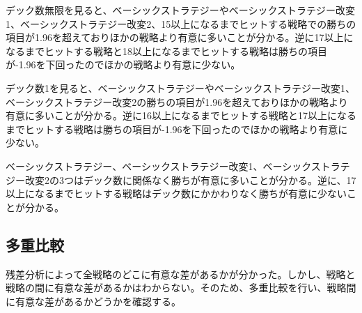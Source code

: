 デック数無限を見ると、ベーシックストラテジーやベーシックストラテジー改変1、ベーシックストラテジー改変2、15以上になるまでヒットする戦略での勝ちの項目が1.96を超えておりほかの戦略より有意に多いことが分かる。逆に17以上になるまでヒットする戦略と18以上になるまでヒットする戦略は勝ちの項目が-1.96を下回ったのでほかの戦略より有意に少ない。

デック数1を見ると、ベーシックストラテジーやベーシックストラテジー改変1、ベーシックストラテジー改変2の勝ちの項目が1.96を超えておりほかの戦略より有意に多いことが分かる。逆に16以上になるまでヒットする戦略と17以上になるまでヒットする戦略は勝ちの項目が-1.96を下回ったのでほかの戦略より有意に少ない。

ベーシックストラテジー、ベーシックストラテジー改変1、ベーシックストラテジー改変2の3つはデック数に関係なく勝ちが有意に多いことが分かる。逆に、17以上になるまでヒットする戦略はデック数にかかわりなく勝ちが有意に少ないことが分かる。

\subsection{多重比較}
残差分析によって全戦略のどこに有意な差があるかが分かった。しかし、戦略と戦略の間に有意な差があるかはわからない。そのため、多重比較を行い、戦略間に有意な差があるかどうかを確認する。


